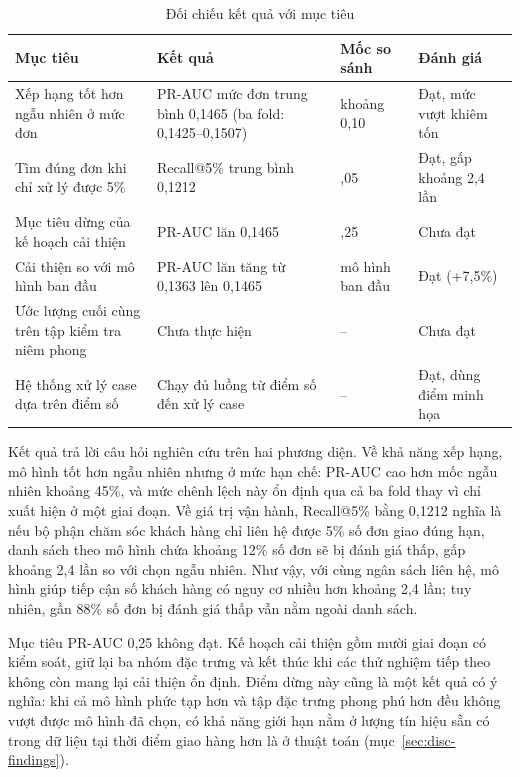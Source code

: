 \begin{table}[htbp]\centering\small
\caption{Đối chiếu kết quả với mục tiêu}\label{tab:disc-goals}
\begin{tabular}{>{\raggedright\arraybackslash}p{4.1cm}>{\raggedright\arraybackslash}p{4.6cm}>{\raggedright\arraybackslash}p{2.3cm}>{\raggedright\arraybackslash}p{2.6cm}}
\toprule
Mục tiêu & Kết quả & Mốc so sánh & Đánh giá \\
\midrule
Xếp hạng tốt hơn ngẫu nhiên ở mức đơn & PR-AUC mức đơn trung bình 0,1465 (ba fold: 0,1425--0,1507) & khoảng 0,10 & Đạt, mức vượt khiêm tốn \\
Tìm đúng đơn khi chỉ xử lý được 5\% & Recall@5\% trung bình 0,1212 & 0,05 & Đạt, gấp khoảng 2,4 lần \\
Mục tiêu dừng của kế hoạch cải thiện & PR-AUC lăn 0,1465 & 0,25 & Chưa đạt \\
Cải thiện so với mô hình ban đầu & PR-AUC lăn tăng từ 0,1363 lên 0,1465 & mô hình ban đầu & Đạt (+7,5\%) \\
Ước lượng cuối cùng trên tập kiểm tra niêm phong & Chưa thực hiện & -- & Chưa đạt \\
Hệ thống xử lý case dựa trên điểm số & Chạy đủ luồng từ điểm số đến xử lý case & -- & Đạt, dùng điểm minh họa \\
\bottomrule
\end{tabular}
\end{table}

Kết quả trả lời câu hỏi nghiên cứu trên hai phương diện. Về khả năng xếp hạng, mô hình tốt hơn ngẫu nhiên nhưng ở mức hạn chế: PR-AUC cao hơn mốc ngẫu nhiên khoảng 45\%, và mức chênh lệch này ổn định qua cả ba fold thay vì chỉ xuất hiện ở một giai đoạn. Về giá trị vận hành, Recall@5\% bằng 0,1212 nghĩa là nếu bộ phận chăm sóc khách hàng chỉ liên hệ được 5\% số đơn giao đúng hạn, danh sách theo mô hình chứa khoảng 12\% số đơn sẽ bị đánh giá thấp, gấp khoảng 2,4 lần so với chọn ngẫu nhiên. Như vậy, với cùng ngân sách liên hệ, mô hình giúp tiếp cận số khách hàng có nguy cơ nhiều hơn khoảng 2,4 lần; tuy nhiên, gần 88\% số đơn bị đánh giá thấp vẫn nằm ngoài danh sách.

Mục tiêu PR-AUC 0,25 không đạt. Kế hoạch cải thiện gồm mười giai đoạn có kiểm soát, giữ lại ba nhóm đặc trưng và kết thúc khi các thử nghiệm tiếp theo không còn mang lại cải thiện ổn định. Điểm dừng này cũng là một kết quả có ý nghĩa: khi cả mô hình phức tạp hơn và tập đặc trưng phong phú hơn đều không vượt được mô hình đã chọn, có khả năng giới hạn nằm ở lượng tín hiệu sẵn có trong dữ liệu tại thời điểm giao hàng hơn là ở thuật toán (mục~\ref{sec:disc-findings}).

